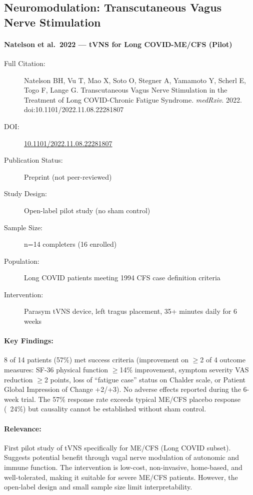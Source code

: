 \subsection{Neuromodulation: Transcutaneous Vagus Nerve Stimulation}

\paragraph{Natelson et al.\ 2022 --- tVNS for Long COVID-ME/CFS (Pilot)}

\begin{description}
    \item[Full Citation:] Natelson BH, Vu T, Mao X, Soto O, Stegner A, Yamamoto Y, Scherl E, Togo F, Lange G. Transcutaneous Vagus Nerve Stimulation in the Treatment of Long COVID-Chronic Fatigue Syndrome. \textit{medRxiv}. 2022. doi:10.1101/2022.11.08.22281807
    \item[DOI:] \href{https://doi.org/10.1101/2022.11.08.22281807}{10.1101/2022.11.08.22281807}
    \item[Publication Status:] Preprint (not peer-reviewed)
    \item[Study Design:] Open-label pilot study (no sham control)
    \item[Sample Size:] n=14 completers (16 enrolled)
    \item[Population:] Long COVID patients meeting 1994 CFS case definition criteria
    \item[Intervention:] Parasym tVNS device, left tragus placement, 35+ minutes daily for 6 weeks
\end{description}

\paragraph{Key Findings:}
8 of 14 patients (57\%) met success criteria (improvement on $\geq$2 of 4 outcome measures: SF-36 physical function $\geq$14\% improvement, symptom severity VAS reduction $\geq$2 points, loss of ``fatigue case'' status on Chalder scale, or Patient Global Impression of Change +2/+3). No adverse effects reported during the 6-week trial. The 57\% response rate exceeds typical ME/CFS placebo response (~24\%) but causality cannot be established without sham control.

\paragraph{Relevance:}
First pilot study of tVNS specifically for ME/CFS (Long COVID subset). Suggests potential benefit through vagal nerve modulation of autonomic and immune function. The intervention is low-cost, non-invasive, home-based, and well-tolerated, making it suitable for severe ME/CFS patients. However, the open-label design and small sample size limit interpretability.

